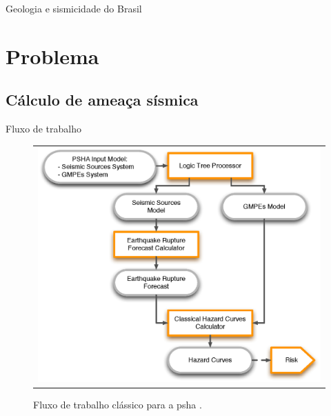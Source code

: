 \documentclass[ucs,8pt]{beamer}
\begin{document}
\begin{frame}{Geologia e sismicidade do Brasil}
\begin{figure}[H]
\begin{subfigure}[T]{0.48\textwidth}
	  \label{fig:br_seis} 
	\end{subfigure}
	\label{fig:eq_record}
\end{figure}
\end{frame}



\section{Problema}
\subsection{Cálculo de ameaça sísmica}

\begin{frame}{Fluxo de trabalho}
\begin{figure}[H]
	\centering
	\begin{tabular}{l}
	\includegraphics[height=0.90\textheight]{classical_psha_workflow}
	\end{tabular}
	\caption{Fluxo de trabalho clássico para a \gls{psha} \citep{crowley_2013}.}
\label{fig:classical_psha}
\end{figure}
\end{frame}
\end{document}
